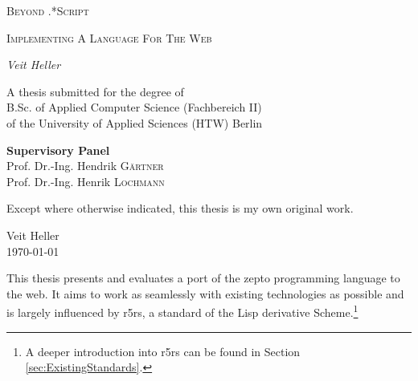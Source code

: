 \documentclass[oneside,11pt,xetex]{scrbook}
\begin{document}
\begin{titlepage}
	\centering
	{\scshape\LARGE Beyond .*Script \par}
	\vspace{1cm}
	{\scshape\Large Implementing A Language For The Web\par}
	\vspace{2cm}
	{\Large\itshape Veit Heller\par}
	\vfill
  A thesis submitted for the degree of \\
  B.Sc. of Applied Computer Science (Fachbereich II) \\
  of the University of Applied Sciences (HTW) Berlin
	\vfill

  \textbf{Supervisory Panel}\\

  Prof. Dr.-Ing. Hendrik \textsc{Gärtner}\\

  Prof. Dr.-Ing. Henrik \textsc{Lochmann}\\
	\vfill

\end{titlepage}

\dedication{\small{\emph{For Meredith, Tobias and all the people who cope with me. Your undying support will not be forgotten.}}}


\frontmatter

\vspace*{0.4\textheight}

\begin{center}
  Except where otherwise indicated, this thesis is my own original
  work.
\end{center}
\vspace*{4cm}

\begin{flushright}
  \begin{minipage}{4cm}
    Veit Heller\\
    \today
  \end{minipage}
\end{flushright}


This thesis presents and evaluates a port of the zepto programming language to the web. It aims to
work as seamlessly with existing technologies as possible and is largely influenced by \gls{r5rs},
a standard of the Lisp derivative Scheme.\footnote{A deeper introduction into \gls{r5rs} can be found
in Section \ref{sec:ExistingStandards}.}
\end{document}

